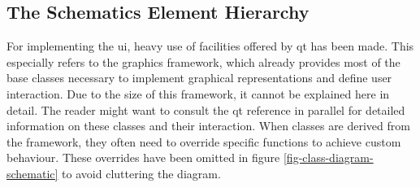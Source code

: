 \subsection{The Schematics Element Hierarchy}

For implementing the \gls{ui}, heavy use of facilities offered by \gls{qt} has been made.
This especially refers to the graphics framework, which already provides most of the base classes necessary to implement graphical representations and define user interaction.
Due to the size of this framework, it cannot be explained here in detail.
The reader might want to consult the \gls{qt} reference %
in parallel for detailed information on these classes and their interaction.
When classes are derived from the framework, they often need to override specific functions to achieve custom behaviour.
These overrides have been omitted in figure \ref{fig-class-diagram-schematic} to avoid cluttering the diagram.

